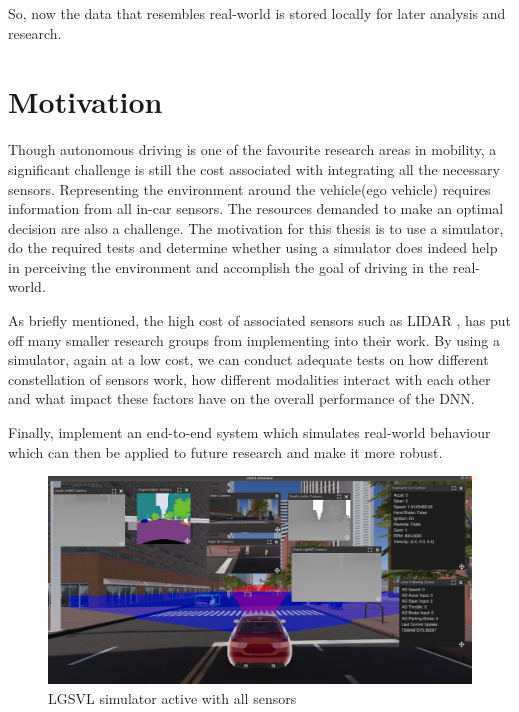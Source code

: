 So, now the data that resembles real-world is stored locally for later analysis and
research.

\section{Motivation}

Though autonomous driving is one of the favourite research areas in mobility, 
a significant challenge is still the cost associated with integrating all the necessary sensors.  
Representing the environment around the vehicle(ego vehicle) requires information from all in-car sensors. 
The resources demanded to make an optimal decision are also a challenge. The motivation for this thesis is 
to use a simulator, do the required tests and 
determine whether using a simulator does indeed help in perceiving the environment 
and accomplish the goal of driving in the real-world. 

As briefly mentioned, the high cost of associated sensors such as LIDAR
\cite{VergeReportLidar},  has put off many smaller research groups from implementing into their
work. By using a simulator, again at a low cost, we can conduct adequate tests 
on how different constellation of sensors work, how different modalities interact with each other and 
what impact these factors have on the overall performance of the DNN.

Finally, implement an end-to-end system which simulates real-world behaviour which can
then be applied to future research and make it more robust.

\begin{figure}[h]
    \begin{center}
        \includegraphics[width = \textwidth]{figures/png/intro/LGSVL_2_scrot_2020-08-26_20-46-55.png}
    \end{center}
    \caption{LGSVL\cite{LGSVL} simulator active with all sensors}
        \label{fig:LGSVL_constellation_sensors}
\end{figure}

